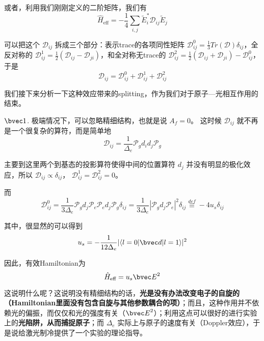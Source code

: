 或者，利用我们刚刚定义的二阶矩阵，我们有
\begin{equation}
\hat{H}_{\text{eff}} = -\frac{1}{4}\sum_{i,j} \tilde{E}_i^* \mathcal{D}_{ij} \tilde{E}_j
\end{equation}

可以把这个 $\mathcal{D}_{ij}$ 拆成三个部分：表示trace的各项同性矩阵 $\mathcal{D}_{ij}^0 = \frac{1}{3}Tr(\mathcal{D})\delta_{ij}$，全反对称的 $\mathcal{D}_{ij}^1 = \frac{1}{2}(\mathcal{D}_{ij} - \mathcal{D}_{ji})$，和全对称无trace的 $\mathcal{D}_{ij}^2 = \frac{1}{2}(\mathcal{D}_{ij} + \mathcal{D}_{ji}) - \mathcal{D}_{ij}^0$，于是
\begin{equation}
\mathcal{D}_{ij} = \mathcal{D}_{ij}^0 + \mathcal{D}_{ij}^1 + \mathcal{D}_{ij}^2
\end{equation}

我们接下来分析一下这种效应带来的splitting，作为我们对于原子—光相互作用的结束。

$\bvec 1$. 极端情况下，可以忽略精细结构，也就是说 $A_f = 0$。 这时候 $\mathcal{D}_{ij}$ 就不再是一个很复杂的算符，而是简单地
\begin{equation}
\mathcal{D}_{ij} = \frac{1}{\Delta_e}\mathcal{P}_g d_i d_j \mathcal{P}_g
\end{equation}

主要到这里两个到基态的投影算符使得中间的位置算符 $d_j$ 并没有明显的极化效应，所以 $\mathcal{D}_{ij} \propto \delta_{ij}$， $\mathcal{D}_{ij} ^1 = \mathcal{D}_{ij} ^2 = 0$。

而
\begin{equation}
\mathcal{D}_{ij}^0 = \frac{1}{3\Delta_e} \mathcal{P}_g d_j \mathcal{P}_e \mathcal{P}_e d_j \mathcal{P}_g \delta_{ij}= \frac{1}{3\Delta_e} |\mathcal{P}_g d_j \mathcal{P}_e|^2\delta_{ij}\overset{def}{\equiv} -4u_s \delta_{ij}
\end{equation}

其中，很显然的可以得到
\begin{equation}
u_s = -\frac{1}{12\Delta_e} |\langle l=0|{\bvec d}|l = 1\rangle|^2
\end{equation}

因此，有效Hamiltonian为
\begin{equation}
\hat{H}_{\text{eff}} = u_s {\bvec E}^2
\end{equation}

这说明什么呢？这说明没有精细结构的话，\textbf{光是没有办法改变电子的自旋的（Hamiltonian里面没有包含自旋与其他参数耦合的项）}；而且，这种作用并不依赖光的偏振，而仅仅和光的强度有关（${\bvec E}^2$）；利用这点可以很好的进行实验上的\textbf{光陷阱，从而捕捉原子}；而 $\Delta_e$ 实际上与原子的速度有关（Doppler效应），于是说给激光制冷提供了一个实验的理论指导。

